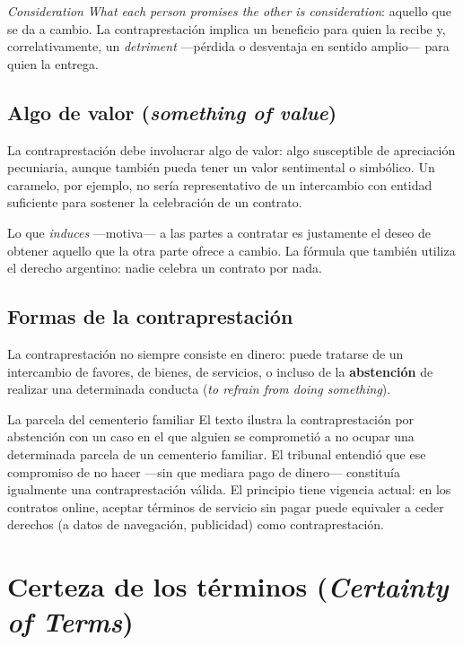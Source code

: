 \documentclass[12pt,oneside]{book}
\begin{document}
\begin{definition}{\textit{Consideration}}
\textit{What each person promises the other is consideration}: aquello que se da a cambio. La contraprestación implica un beneficio para quien la recibe y, correlativamente, un \textit{detriment} ---pérdida o desventaja en sentido amplio--- para quien la entrega.
\end{definition}

\subsection{Algo de valor (\textit{something of value})}

La contraprestación debe involucrar algo de valor: algo susceptible de apreciación pecuniaria, aunque también pueda tener un valor sentimental o simbólico. Un caramelo, por ejemplo, no sería representativo de un intercambio con entidad suficiente para sostener la celebración de un contrato.

Lo que \textit{induces} ---motiva--- a las partes a contratar es justamente el deseo de obtener aquello que la otra parte ofrece a cambio. La fórmula que también utiliza el derecho argentino: nadie celebra un contrato por nada.

\subsection{Formas de la contraprestación}

La contraprestación no siempre consiste en dinero: puede tratarse de un intercambio de favores, de bienes, de servicios, o incluso de la \textbf{abstención} de realizar una determinada conducta (\textit{to refrain from doing something}).

\begin{example}{La parcela del cementerio familiar}
El texto ilustra la contraprestación por abstención con un caso en el que alguien se comprometió a no ocupar una determinada parcela de un cementerio familiar. El tribunal entendió que ese compromiso de no hacer ---sin que mediara pago de dinero--- constituía igualmente una contraprestación válida. El principio tiene vigencia actual: en los contratos online, aceptar términos de servicio sin pagar puede equivaler a ceder derechos (a datos de navegación, publicidad) como contraprestación.
\end{example}

\section{Certeza de los términos (\textit{Certainty of Terms})}
\end{document}
